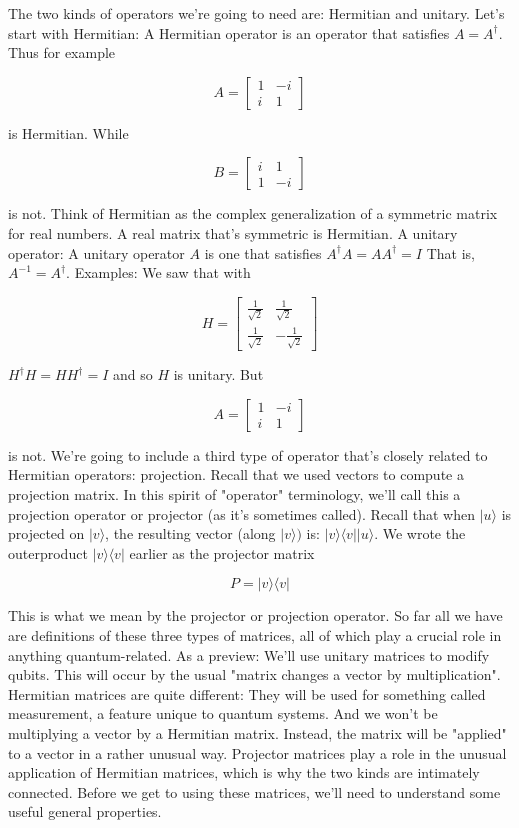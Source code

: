 \documentclass[main.tex]{subfiles}
\begin{document}
    The two kinds of operators we're going to need are: Hermitian and unitary. Let's start with Hermitian: A Hermitian operator is an operator that satisfies $A=A^{\dagger}$. Thus for example
    
    $$
    A=\left[\begin{array}{cc}
    1 & -i \\
    i & 1
    \end{array}\right]
    $$
    
    is Hermitian. While
    
    $$
    B=\left[\begin{array}{cc}
    i & 1 \\
    1 & -i
    \end{array}\right]
    $$
    
    is not. Think of Hermitian as the complex generalization of a symmetric matrix for real numbers. A real matrix that's symmetric is Hermitian. A unitary operator: A unitary operator $A$ is one that satisfies $A^{\dagger} A=A A^{\dagger}=I$ That is, $A^{-1}=A^{\dagger}$. Examples: We saw that with
    
    $$
    H=\left[\begin{array}{rr}
    \frac{1}{\sqrt{2}} & \frac{1}{\sqrt{2}} \\
    \frac{1}{\sqrt{2}} & -\frac{1}{\sqrt{2}}
    \end{array}\right]
    $$
    
    $H^{\dagger} H=H H^{\dagger}=I$ and so $H$ is unitary. But
    
    $$
    A=\left[\begin{array}{cc}
    1 & -i \\
    i & 1
    \end{array}\right]
    $$
    
    is not. We're going to include a third type of operator that's closely related to Hermitian operators: projection. Recall that we used vectors to compute a projection matrix. In this spirit of "operator" terminology, we'll call this a projection operator or projector (as it's sometimes called). Recall that when $|u\rangle$ is projected on $|v\rangle$, the resulting vector (along $|v\rangle)$ is: $|v\rangle\langle v|| u\rangle$. We wrote the outerproduct $|v\rangle\langle v|$ earlier as the projector matrix
    
    $$
    P=|v\rangle\langle v|
    $$
    
    This is what we mean by the projector or projection operator. So far all we have are definitions of these three types of matrices, all of which play a crucial role in anything quantum-related. As a preview: We'll use unitary matrices to modify qubits. This will occur by the usual "matrix changes a vector by multiplication". Hermitian matrices are quite different: They will be used for something called measurement, a feature unique to quantum systems. And we won't be multiplying a vector by a Hermitian matrix. Instead, the matrix will be "applied" to a vector in a rather unusual way. Projector matrices play a role in the unusual application of Hermitian matrices, which is why the two kinds are intimately connected. Before we get to using these matrices, we'll need to understand some useful general properties.
    
\end{document}

